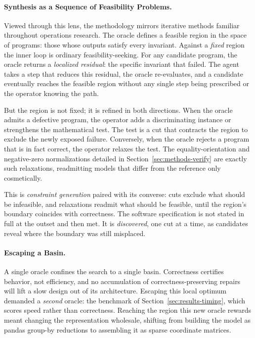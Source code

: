 \documentclass[runningheads]{llncs}
\begin{document}
\paragraph{Synthesis as a Sequence of Feasibility Problems.} Viewed through this lens, the methodology mirrors iterative methods familiar throughout operations research. The oracle defines a feasible region in the space of programs: those whose outputs satisfy every invariant. Against a \emph{fixed} region the inner loop is ordinary feasibility-seeking. For any candidate program, the oracle returns a \emph{localized residual}: the specific invariant that failed. The agent takes a step that reduces this residual, the oracle re-evaluates, and a candidate eventually reaches the feasible region without any single step being prescribed or the operator knowing the path. 

But the region is not fixed; it is refined in both directions. When the oracle admits a defective program, the operator adds a discriminating instance or strengthens the mathematical test. The test is a cut that contracts the region to exclude the newly exposed failure. Conversely, when the oracle rejects a program that is in fact correct, the operator relaxes the test. The equality-orientation and negative-zero normalizations detailed in Section~\ref{sec:methods-verify} are exactly such relaxations, readmitting models that differ from the reference only cosmetically. 

This is \emph{constraint generation} paired with its converse: cuts exclude what should be infeasible, and relaxations readmit what should be feasible, until the region's boundary coincides with correctness. The software specification is not stated in full at the outset and then met. It is \emph{discovered}, one cut at a time, as candidates reveal where the boundary was still misplaced.

\paragraph{Escaping a Basin.} A single oracle confines the search to a single basin. Correctness certifies behavior, not efficiency, and no accumulation of correctness-preserving repairs will lift a slow design out of its architecture. Escaping this local optimum demanded a \emph{second} oracle: the benchmark of Section~\ref{sec:results-timing}, which scores speed rather than correctness. Reaching the region this new oracle rewards meant changing the representation wholesale, shifting from building the model as pandas group-by reductions to assembling it as sparse coordinate matrices. 
\end{document}
